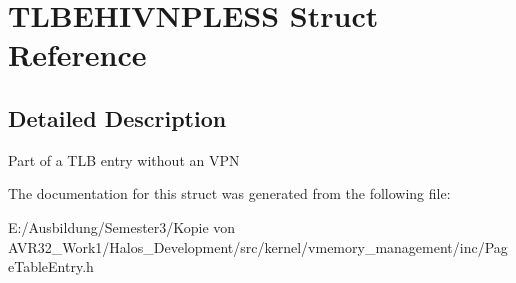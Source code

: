 \hypertarget{struct_t_l_b_e_h_i_v_n_p_l_e_s_s}{
\section{TLBEHIVNPLESS Struct Reference}
\label{struct_t_l_b_e_h_i_v_n_p_l_e_s_s}
}


\subsection{Detailed Description}
Part of a TLB entry without an VPN 

The documentation for this struct was generated from the following file:\begin{CompactItemize}
\item 
E:/Ausbildung/Semester3/Kopie von AVR32\_\-Work1/Halos\_\-Development/src/kernel/vmemory\_\-management/inc/PageTableEntry.h\end{CompactItemize}
